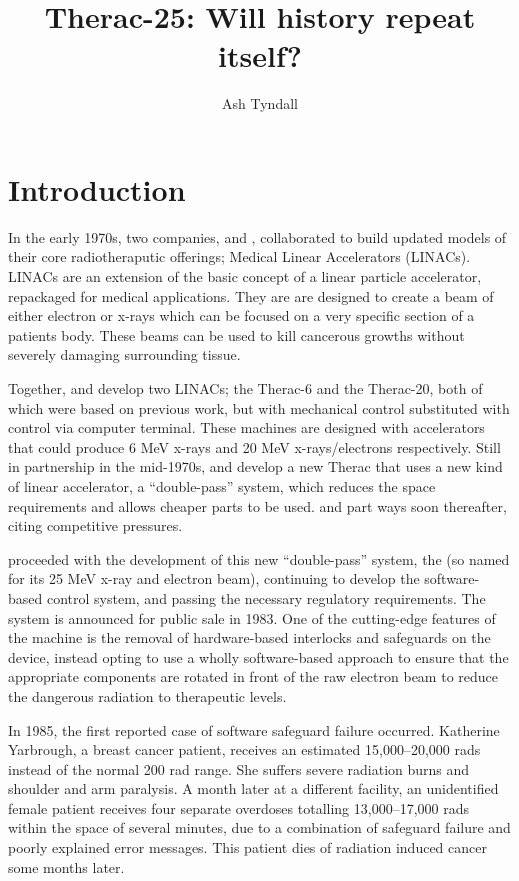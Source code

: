 \documentclass{cshonours}
\title{Therac-25: Will history repeat itself?}
\author{Ash Tyndall}
\begin{document}
\maketitle

\tableofcontents

\chapter{Introduction}

In the early 1970s, two companies, \aecl and \cgr, collaborated to build updated models of their core radiotheraputic offerings; Medical Linear Accelerators (LINACs). LINACs are an extension of the basic concept of a linear particle accelerator, repackaged for medical applications. They are are designed to create a beam of either electron or x-rays which can be focused on a very specific section of a patients body. These beams can be used to kill cancerous growths without severely damaging surrounding tissue.

Together, \aecl and \cgr develop two LINACs; the Therac-6 and the Therac-20, both of which were based on previous \cgr work, but with mechanical control substituted with control via computer terminal. These machines are designed with accelerators that could produce 6 MeV x-rays and 20 MeV x-rays/electrons respectively. Still in partnership in the mid-1970s, \aecl and \cgr develop a new Therac that uses a new kind of linear accelerator, a ``double-pass'' system, which reduces the space requirements and allows cheaper parts to be used. \aecl and \cgr part ways soon thereafter, citing competitive pressures. 

\aecl proceeded with the development of this new ``double-pass'' system, the \ther (so named for its 25 MeV x-ray and electron beam), continuing to develop the software-based control system, and passing the necessary regulatory requirements. The system is announced for public sale in 1983. One of the cutting-edge features of the machine is the removal of hardware-based interlocks and safeguards on the device, \aecl instead opting to use a wholly software-based approach to ensure that the appropriate components are rotated in front of the raw electron beam to reduce the dangerous radiation to therapeutic levels.

In 1985, the first reported case of \ther software safeguard failure occurred. Katherine Yarbrough, a breast cancer patient, receives an estimated 15,000--20,000 rads instead of the normal 200 rad range. She suffers severe radiation burns and shoulder and arm paralysis. A month later at a different facility, an unidentified female patient receives four separate overdoses totalling 13,000--17,000 rads within the space of several minutes, due to a combination of safeguard failure and poorly explained error messages. This patient dies of radiation induced cancer some months later.
\end{document}
